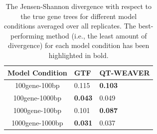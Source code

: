 \documentclass[10pt,a4paper]{article}
\begin{document}
\begin{table}[h!]
    \centering
    \caption{The Jensen-Shannon divergence with respect to the true gene trees for different model conditions averaged over all replicates. The best-performing method (i.e., the least amount of divergence) for each model condition has been highlighted in bold.}
    \label{tab:15-dom-mismatch-divergence}

    \begin{tabular}{|c|C{3cm}|C{3cm}|}
        \hline
        \textbf{Model Condition} & \textbf{GTF} & \textbf{QT-WEAVER} \\
        \hline
        100gene-100bp & 0.115 & \textbf{0.103} \\
        \hline
        100gene-1000bp & \textbf{0.043} & 0.049 \\
        \hline
        1000gene-100bp & 0.101 & \textbf{0.087} \\
        \hline
        1000gene-1000bp & \textbf{0.031} & 0.037 \\
        \hline
    \end{tabular}
\end{table}

\end{document}
